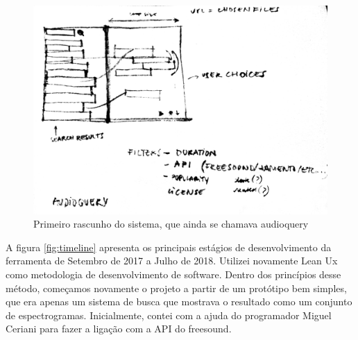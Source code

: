 \begin{figure}

\includegraphics[width=1\textwidth]{pictures/cap4/firstsketch}
\caption{\label{firstsketch}Primeiro rascunho do sistema, que ainda se chamava audioquery}
\label{fig:firstsketch}
\end{figure}


A figura \ref{fig:timeline} apresenta os principais estágios de desenvolvimento da ferramenta de Setembro de 2017 a Julho de 2018. Utilizei novamente Lean Ux \cite{Liikkanen2014} como metodologia de desenvolvimento de software. Dentro dos princípios desse método, começamos novamente o projeto a partir de um protótipo bem simples, que era apenas um sistema de busca que mostrava o resultado como um conjunto de espectrogramas. Inicialmente, contei com a ajuda do programador Miguel Ceriani para fazer a ligação com a API do freesound.

